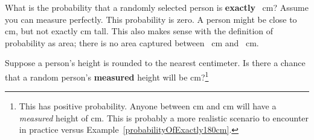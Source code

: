 \begin{example}{What is the probability that a randomly selected person is \textbf{exactly} ~cm? Assume you can measure perfectly.}
\label{probabilityOfExactly180cm}
This probability is zero. A person might be close to  cm, but not exactly  cm tall. This also makes sense with the definition of probability as area; there is no area captured between ~cm and ~cm.
\end{example}

\begin{exercise}
Suppose a person's height is rounded to the nearest centimeter. Is there a chance that a random person's \textbf{measured} height will be  cm?\footnote{This has positive probability. Anyone between  cm and  cm will have a \emph{measured} height of  cm. This is probably a more realistic scenario to encounter in practice versus Example~\ref{probabilityOfExactly180cm}.}
\end{exercise}




